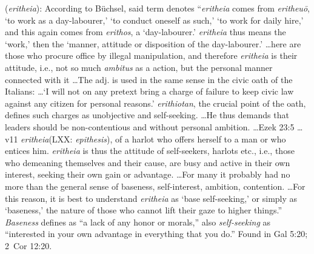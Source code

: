 \item[Self-seeking,]

(\textit{eritheia}):
According to Büchsel, said term denotes ``\emph{eritheia} comes from \emph{eritheuō}, `to work as a day-labourer,' `to conduct oneself as such,' `to work for daily hire,' and this again comes from \emph{erithos}, a `day-labourer.' \emph{eritheia} thus means the `work,' then the `manner, attitude or disposition of the day-labourer.' \ldots here are those who procure office by illegal manipulation, and therefore \emph{eritheia} is their attitude, i.e., not so much \emph{ambitus} as a action, but the personal manner connected with it \ldots The adj. is used in the same sense in the civic oath of the Italians: \ldots `I will not on any pretext bring a charge of failure to keep civic law against any citizen for personal reasons.' \emph{erithiotan}, the crucial point of the oath, defines such charges as unobjective and self-seeking. \ldots He thus demands that leaders should be non-contentious and without personal ambition. \ldots Ezek 23:5 \ldots v11 \emph{eritheia}(LXX: \emph{epithesis}), of a harlot who offers herself to a man or who entices him. \emph{eritheia} is thus the attitude of self-seekers, harlots etc., i.e., those who demeaning themselves and their cause, are busy and active in their own interest, seeking their own gain or advantage. \ldots For many it probably had no more than the general sense of baseness, self-interest, ambition, contention. \ldots For this reason, it is best to understand \emph{eritheia} as `base self-seeking,' or simply as `baseness,' the nature of those who cannot lift their gaze to higher things.''
\emph{Baseness} defines as ``a lack of any honor or morals,'' also \emph{self-seeking} as ``interested in your own advantage in everything that you do.''
Found in Gal 5:20; 2~Cor 12:20.
